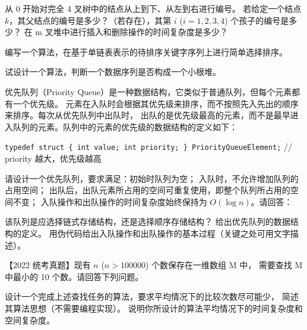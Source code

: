 \begin{qitems}
\begin{bbox}
\begin{subqitems}
            
            \subqitem 从 0 开始对完全 4 叉树中的结点从上到下、从左到右进行编号。
            若给定一个结点 $k$，其父结点的编号是多少？（若存在），其第 $i$ ($i=1, 2, 3, 4$) 个孩子的编号是多少？
            \subqitem 在 m 叉堆中进行插入和删除操作的时间复杂度是多少？
        \end{subqitems}
    \end{bbox}
    \begin{bbox}
        \qitem 编写一个算法，在基于单链表表示的待排序关键字序列上进行简单选择排序。
    \end{bbox}
    \begin{bbox}
        \qitem 试设计一个算法，判断一个数据序列是否构成一个小根堆。
    \end{bbox}
    \begin{bbox}
        \qitem 优先队列（Priority Queue）是一种数据结构，它类似于普通队列，但每个元素都有一个优先级。
        元素在入队时会根据其优先级来排序，而不按照先入先出的顺序来排序。每次从优先队列中出队时，
        出队的是优先级最高的元素，而不是最早进入队列的元素。队列中的元素的优先级的数据结构的定义如下：
        
        \quad \lstinline|typedef struct { int value; int priority; } PriorityQueueElement;| // priority 越大，优先级越高
        
        请设计一个优先队列，要求满足：初始时队列为空；
        入队时，不允许增加队列的占用空间；
        出队后，出队元素所占用的空间可重复使用，即整个队列所占用的空间不变；
        入队操作和出队操作的时间复杂度始终保持为 $O(\log n)$。请回答：
        \begin{subqitems}
            \subqitem 该队列是应选择链式存储结构，还是选择顺序存储结构？
            \subqitem 给出优先队列的数据结构的定义。
            \subqitem 用伪代码给出入队操作和出队操作的基本过程（关键之处可用文字描述）。
        \end{subqitems}
    \end{bbox}
    \begin{bbox}
        \qitem 【2022 统考真题】现有 $n$ ($n > 100000$) 个数保存在一维数组 M 中，
        需要查找 M 中最小的 10 个数。请回答下列问题。
        \begin{subqitems}
            \subqitem 设计一个完成上述查找任务的算法，要求平均情况下的比较次数尽可能少，
            简述其算法思想（不需要编程实现）。
            \subqitem 说明你所设计的算法平均情况下的时间复杂度和空间复杂度。
        \end{subqitems}
    \end{bbox}
\end{qitems} 